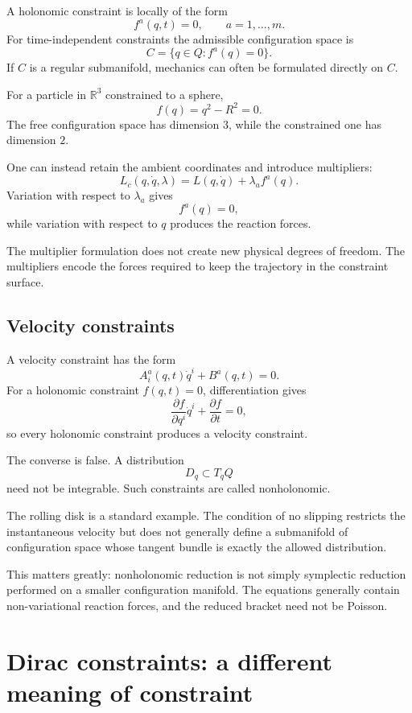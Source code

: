 \documentclass[11pt,a4paper]{article}
\newcommand{\R}{\mathbb R}
\theoremstyle{definition}
\begin{document}
A holonomic constraint is locally of the form
\[
        f^a(q,t)=0,
        \qquad a=1,\ldots,m.
\]
For time-independent constraints the admissible configuration space is
\[
        C=\{q\in Q:f^a(q)=0\}.
\]
If $C$ is a regular submanifold, mechanics can often be formulated directly
on $C$.

For a particle in $\R^3$ constrained to a sphere,
\[
        f(q)=q^2-R^2=0.
\]
The free configuration space has dimension $3$, while the constrained one has
dimension $2$.

One can instead retain the ambient coordinates and introduce multipliers:
\[
        L_c(q,\dot q,\lambda)
        =
        L(q,\dot q)+\lambda_a f^a(q).
\]
Variation with respect to $\lambda_a$ gives
\[
        f^a(q)=0,
\]
while variation with respect to $q$ produces the reaction forces.

The multiplier formulation does not create new physical degrees of freedom.
The multipliers encode the forces required to keep the trajectory in the
constraint surface.

\subsection{Velocity constraints}

A velocity constraint has the form
\[
        A^a_i(q,t)\dot q^i+B^a(q,t)=0.
\]
For a holonomic constraint $f(q,t)=0$, differentiation gives
\[
        \frac{\partial f}{\partial q^i}\dot q^i+
        \frac{\partial f}{\partial t}=0,
\]
so every holonomic constraint produces a velocity constraint.

The converse is false.  A distribution
\[
        D_q\subset T_qQ
\]
need not be integrable.  Such constraints are called nonholonomic.

The rolling disk is a standard example.  The condition of no slipping restricts
the instantaneous velocity but does not generally define a submanifold of
configuration space whose tangent bundle is exactly the allowed distribution.

This matters greatly: nonholonomic reduction is not simply symplectic
reduction performed on a smaller configuration manifold.  The equations
generally contain non-variational reaction forces, and the reduced bracket
need not be Poisson.

\section{Dirac constraints: a different meaning of constraint}
\end{document}
